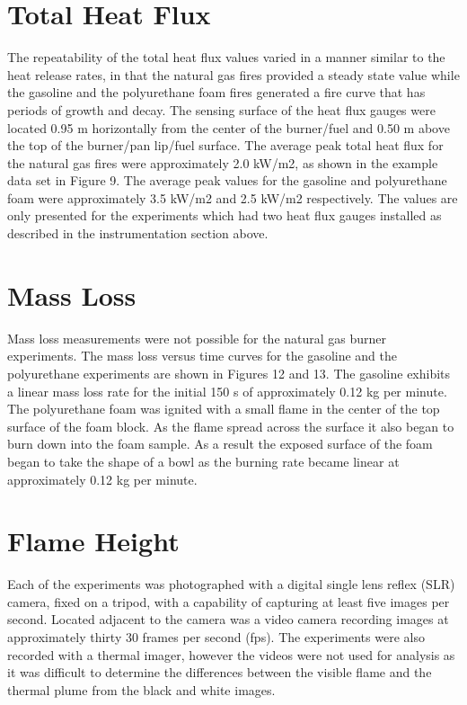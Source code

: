 \documentclass[twoside]{uocthesis}
\begin{document}
{\section{Total Heat Flux}

The repeatability of the total heat flux values varied in a manner similar to the heat release rates, in that the natural gas fires provided a steady state value while the gasoline and the polyurethane foam fires generated a fire curve that has periods of growth and decay.   The sensing surface of the heat flux gauges were located 0.95 m horizontally from the center of the burner/fuel and 0.50 m above the top of the burner/pan lip/fuel surface.  The average peak total heat flux for the natural gas fires were approximately 2.0 kW/m2, as shown in the example data set in Figure 9.  The average peak values for the gasoline and polyurethane foam were approximately 3.5 kW/m2 and 2.5 kW/m2 respectively.  The values are only presented for the experiments which had two heat flux gauges installed as described in the instrumentation section above.


\section{Mass Loss}

Mass loss measurements were not possible for the natural gas burner experiments.  The mass loss versus time curves for the gasoline and the polyurethane experiments are shown in Figures 12 and 13.  The gasoline exhibits a linear mass loss rate for the initial 150 s of approximately 0.12 kg per minute.  The polyurethane foam was ignited with a small flame in the center of the top surface of the foam block.  As the flame spread across the surface it also began to burn down into the foam sample.  As a result the exposed surface of the foam began to take the shape of a bowl as the burning rate became linear at approximately 0.12 kg per minute.   


\section{Flame Height}

Each of the experiments was photographed with a digital single lens reflex (SLR) camera, fixed on a tripod, with a capability of capturing at least five images per second.  Located adjacent to the camera was a video camera recording images at approximately thirty 30 frames per second (fps).  The experiments were also recorded with a thermal imager, however the videos were not used for analysis as it was difficult to determine the differences between the visible flame and the thermal plume from the black and white images. 
 
}
\end{document}
